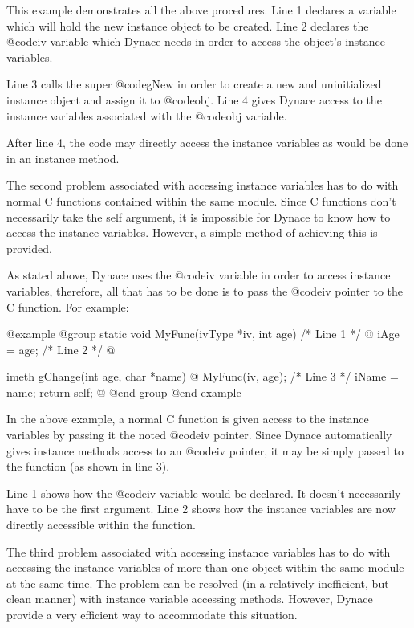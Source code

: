 This example demonstrates all the above procedures.  Line 1 declares a
variable which will hold the new instance object to be created.  Line 2
declares the @code{iv} variable which Dynace needs in order to access
the object's instance variables.

Line 3 calls the super @code{gNew} in order to create a new and
uninitialized instance object and assign it to @code{obj}.  Line 4
gives Dynace access to the instance variables associated with the
@code{obj} variable.

After line 4, the code may directly access the instance variables
as would be done in an instance method.

The second problem associated with accessing instance variables has
to do with normal C functions contained within the same module.
Since C functions don't necessarily take the self argument, it is
impossible for Dynace to know how to access the instance variables.
However, a simple method of achieving this is provided.

As stated above, Dynace uses the @code{iv} variable in order to
access instance variables, therefore, all that has to be done is
to pass the @code{iv} pointer to the C function.  For example:

@example
@group
static  void    MyFunc(ivType *iv, int age)     /*  Line 1  */
@{
        iAge = age;                             /*  Line 2  */
@}

imeth   gChange(int age, char *name)
@{
        MyFunc(iv, age);                        /*  Line 3  */
        iName = name;
        return self;
@}
@end group
@end example

In the above example, a normal C function is given access to the
instance variables by passing it the noted @code{iv} pointer.
Since Dynace automatically gives instance methods access to an
@code{iv} pointer, it may be simply passed to the function
(as shown in line 3).

Line 1 shows how the @code{iv} variable would be declared.  It doesn't
necessarily have to be the first argument.  Line 2 shows how the
instance variables are now directly accessible within the function.

The third problem associated with accessing instance variables has to do
with accessing the instance variables of more than one object within the
same module at the same time.  The problem can be resolved (in a relatively
inefficient, but clean manner) with instance variable accessing methods.
However, Dynace provide a very efficient way to accommodate this situation.

